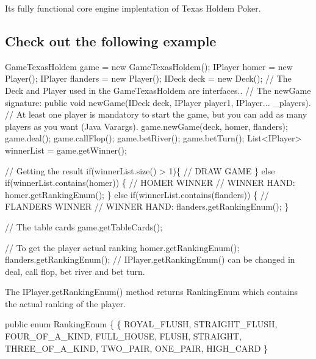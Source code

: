 It\textquotesingle{}s fully functional core engine implentation of Texas Hold\textquotesingle{}em Poker.

\subsection*{Check out the following example}


\begin{DoxyCode}
GameTexasHoldem game = \textcolor{keyword}{new} GameTexasHoldem();
IPlayer homer = \textcolor{keyword}{new} Player();
IPlayer flanders = \textcolor{keyword}{new} Player();
IDeck deck = \textcolor{keyword}{new} Deck();
\textcolor{comment}{// The Deck and Player used in the GameTexasHoldem are interfaces..}
\textcolor{comment}{// The newGame signature: public void newGame(IDeck deck, IPlayer player1, IPlayer... \_players).}
\textcolor{comment}{// At least one player is mandatory to start the game, but you can add as many players as you want (Java
       Varargs).}
game.newGame(deck, homer, flanders);
game.deal();
game.callFlop();
game.betRiver();
game.betTurn();
List<IPlayer> winnerList = game.getWinner();

    \textcolor{comment}{// Getting the result}
\textcolor{keywordflow}{if}(winnerList.size() > 1)\{
    \textcolor{comment}{// DRAW GAME}
\} \textcolor{keywordflow}{else} \textcolor{keywordflow}{if}(winnerList.contains(homer)) \{
    \textcolor{comment}{// HOMER WINNER}
    \textcolor{comment}{// WINNER HAND: homer.getRankingEnum();}
\} \textcolor{keywordflow}{else} \textcolor{keywordflow}{if}(winnerList.contains(flanders)) \{
    \textcolor{comment}{// FLANDERS WINNER}
    \textcolor{comment}{// WINNER HAND: flanders.getRankingEnum();}
\}

\textcolor{comment}{// The table cards}
game.getTableCards(); 

\textcolor{comment}{// To get the player actual ranking}
homer.getRankingEnum();
flanders.getRankingEnum();
\textcolor{comment}{// IPlayer.getRankingEnum() can be changed in deal, call flop, bet river and bet turn.}
\end{DoxyCode}


The I\+Player.\+get\+Ranking\+Enum() method returns Ranking\+Enum which contains the actual ranking of the player.


\begin{DoxyCode}
\textcolor{keyword}{public} \textcolor{keyword}{enum} RankingEnum \{ \{
    ROYAL\_FLUSH, 
    STRAIGHT\_FLUSH, 
    FOUR\_OF\_A\_KIND, 
    FULL\_HOUSE, 
    FLUSH, 
    STRAIGHT, 
    THREE\_OF\_A\_KIND, 
    TWO\_PAIR, 
    ONE\_PAIR, 
    HIGH\_CARD
\}
\end{DoxyCode}


